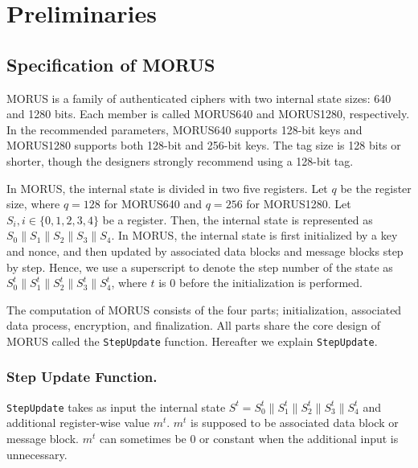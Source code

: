 \documentclass{llncs}
\newcommand{\cipher}[1]{\textsf{#1}}
\begin{document}
\section{Preliminaries}
\subsection{Specification of MORUS}
MORUS is a family of authenticated ciphers with two internal state sizes: 640 and 1280 bits. Each member is called \cipher{MORUS640} and \cipher{MORUS1280}, respectively. In the recommended parameters, \cipher{MORUS640} supports 128-bit keys and \cipher{MORUS1280} supports both 128-bit and 256-bit keys. The tag size is 128 bits or shorter, though the designers strongly recommend using a 128-bit tag.

In MORUS, the internal state is divided in two five registers. Let $q$ be the register size, where $q = 128$ for \cipher{MORUS640} and $q=256$ for \cipher{MORUS1280}. Let $S_i, i \in\{0,1,2,3,4\}$ be a register. Then, the internal state is represented as $S_0\|S_1\|S_2\|S_3\|S_4$. In MORUS, the internal state is first initialized by a key and nonce, and then updated by associated data blocks and message blocks step by step. Hence, we use a superscript to denote the step number of the state as $S^t_0\|S^t_1\|S^t_2\|S^t_3\|S^t_4$, where $t$ is 0 before the initialization is performed.

The computation of MORUS consists of the four parts; initialization, associated data process, encryption, and finalization. All parts share the core design of MORUS called the {\tt StepUpdate} function. Hereafter we explain {\tt StepUpdate}.

\subsubsection{Step Update Function.}
{\tt StepUpdate} takes as input the internal state $S^t = S^t_0\|S^t_1\|S^t_2\|S^t_3\|S^t_4$ and additional register-wise value $m^t$. $m^t$ is supposed to be associated data block or message block. $m^t$ can sometimes be 0 or constant when the additional input is unnecessary.
\end{document}
